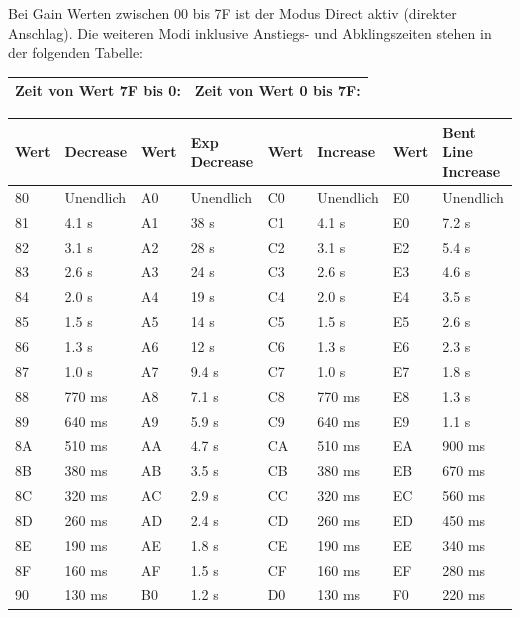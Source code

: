 \bigskip

Bei Gain Werten zwischen 00 bis 7F ist der Modus Direct aktiv (direkter Anschlag).
Die weiteren Modi inklusive Anstiegs- und Abklingszeiten stehen in der folgenden Tabelle:

\bigskip

\begin{table}[htbp]
\begin{tabularx}{\textwidth}{|X|X|}
	\hline
	Zeit von Wert 7F bis 0: & Zeit von Wert 0 bis 7F: \\
	\hline
\end{tabularx}

\begin{tabularx}{\textwidth}{|l|X|l|X|l|X|l|X|}
	\hline
	Wert & Decrease & Wert & Exp Decrease & Wert & Increase & Wert & Bent Line Increase \\
	\hline
	80 & Unendlich & A0 & Unendlich & C0 & Unendlich & E0 & Unendlich \\
	\hline
	81 & 4.1 s & A1 & 38 s & C1 & 4.1 s & E0 & 7.2 s \\
	\hline
	82 & 3.1 s & A2 & 28 s & C2 & 3.1 s & E2 & 5.4 s \\
	\hline
	83 & 2.6 s & A3 & 24 s & C3 & 2.6 s & E3 & 4.6 s \\
	\hline
	84 & 2.0 s & A4 & 19 s & C4 & 2.0 s & E4 & 3.5 s \\
	\hline
	85 & 1.5 s & A5 & 14 s & C5 & 1.5 s & E5 & 2.6 s \\
	\hline
	86 & 1.3 s & A6 & 12 s & C6 & 1.3 s & E6 & 2.3 s \\
	\hline
	87 & 1.0 s & A7 & 9.4 s & C7 & 1.0 s & E7 & 1.8 s \\
	\hline
	88 & 770 ms & A8 & 7.1 s & C8 & 770 ms & E8 & 1.3 s \\
	\hline
	89 & 640 ms & A9 & 5.9 s & C9 & 640 ms & E9 & 1.1 s \\
	\hline
	8A & 510 ms & AA & 4.7 s & CA & 510 ms & EA & 900 ms \\
	\hline
	8B & 380 ms & AB & 3.5 s & CB & 380 ms & EB & 670 ms \\
	\hline
	8C & 320 ms & AC & 2.9 s & CC & 320 ms & EC & 560 ms \\
	\hline
	8D & 260 ms & AD & 2.4 s & CD & 260 ms & ED & 450 ms \\
	\hline
	8E & 190 ms & AE & 1.8 s & CE & 190 ms & EE & 340 ms \\
	\hline
	8F & 160 ms & AF & 1.5 s & CF & 160 ms & EF & 280 ms \\
	\hline
	90 & 130 ms & B0 & 1.2 s & D0 & 130 ms & F0 & 220 ms \\

\end{tabularx}
\end{table}
